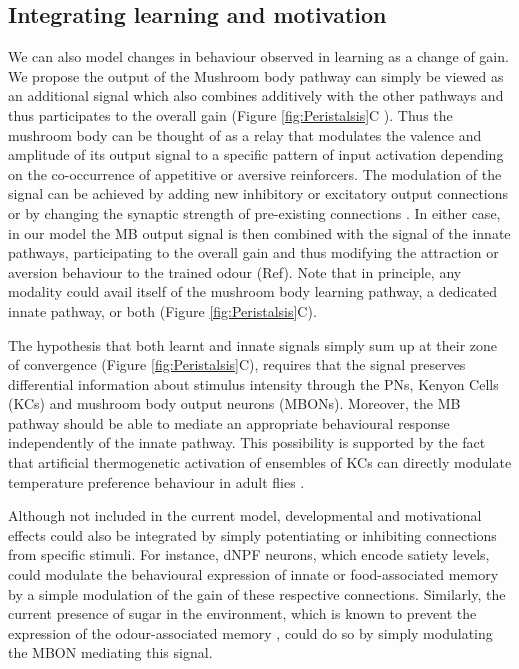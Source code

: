 \documentclass[11pt,a4paper]{article}
\newcommand{\todoBW}[1]{\todo[author=BW,color=orange, size=\tiny,inline]{1}}
\begin{document}
\subsection{Integrating learning and motivation}
We can also model changes in behaviour observed in learning as a change of gain. We propose the output of the Mushroom body pathway \citep{gerber2004engram} can simply be viewed as an additional signal which also combines additively with the other pathways and thus participates to the overall gain (Figure \ref{fig:Peristalsis}C ). Thus the mushroom body can be thought of as a relay that modulates the valence and amplitude of its output signal to a specific pattern of input activation depending on the co-occurrence of appetitive or aversive reinforcers. The modulation of the signal can be achieved by adding new inhibitory or excitatory output connections or by changing the synaptic strength of pre-existing connections \citep{aso2014neuronal}. In either case, in our model the MB output signal is then combined with the signal of the innate pathways, participating to the overall gain and thus modifying the attraction or aversion behaviour to the trained odour (Ref).
\todoBW{needs ref?}
 Note that in principle, any modality could avail itself of the mushroom body learning pathway, a dedicated innate pathway, or both (Figure \ref{fig:Peristalsis}C). 

The hypothesis that both learnt and innate signals simply sum up at their zone of convergence (Figure \ref{fig:Peristalsis}C), requires that the signal preserves differential information about stimulus intensity through the PNs, Kenyon Cells (KCs) and mushroom body output neurons (MBONs). Moreover, the MB pathway should be able to mediate an appropriate behavioural response independently of the innate pathway. This possibility is supported by the fact that artificial thermogenetic activation of ensembles of KCs can directly modulate temperature preference behaviour in adult flies \citep{vasmer2014induction}. 

Although not included in the current model, developmental \citep{gong2010two,wu2003developmental} and motivational \citep{krashes2009neural} %
 effects could also be integrated by simply potentiating or inhibiting connections from specific stimuli. For instance, dNPF neurons, which encode satiety levels, could modulate the behavioural expression of innate or food-associated memory \citep{krashes2009neural}  by a simple modulation of the gain of these respective connections. Similarly, the current presence of sugar in the environment, which is known to prevent the expression of the odour-associated memory \citep{schleyer2011behavior}, could do so by simply modulating the MBON mediating this signal. 
\end{document}
